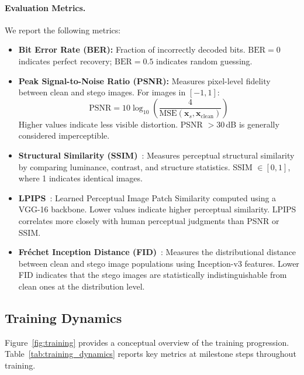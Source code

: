 \documentclass[10pt, twocolumn]{article}
\begin{document}
\paragraph{Evaluation Metrics.}
We report the following metrics:
\begin{itemize}[itemsep=1pt, topsep=2pt]
    \item \textbf{Bit Error Rate (BER):} Fraction of incorrectly decoded bits. $\text{BER} = 0$ indicates perfect recovery; $\text{BER} = 0.5$ indicates random guessing.
    \item \textbf{Peak Signal-to-Noise Ratio (PSNR):} Measures pixel-level fidelity between clean and stego images. For images in $[-1, 1]$:
    \begin{equation}
        \text{PSNR} = 10 \log_{10}\!\left(\frac{4}{\text{MSE}(\mathbf{x}_s, \mathbf{x}_\text{clean})}\right)
    \end{equation}
    Higher values indicate less visible distortion. PSNR $> 30$\,dB is generally considered imperceptible.
    \item \textbf{Structural Similarity (SSIM)}~\cite{wang2004image}: Measures perceptual structural similarity by comparing luminance, contrast, and structure statistics. SSIM $\in [0, 1]$, where 1 indicates identical images.
    \item \textbf{LPIPS}~\cite{zhang2018unreasonable}: Learned Perceptual Image Patch Similarity computed using a VGG-16 backbone. Lower values indicate higher perceptual similarity. LPIPS correlates more closely with human perceptual judgments than PSNR or SSIM.
    \item \textbf{Fr\'{e}chet Inception Distance (FID)}~\cite{heusel2017gans}: Measures the distributional distance between clean and stego image populations using Inception-v3 features. Lower FID indicates that the stego images are statistically indistinguishable from clean ones at the distribution level.
\end{itemize}

\subsection{Training Dynamics}
\label{sec:dynamics}

Figure~\ref{fig:training} provides a conceptual overview of the training progression.
Table~\ref{tab:training_dynamics} reports key metrics at milestone steps throughout training.
\end{document}
